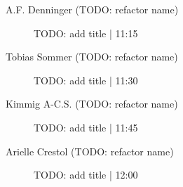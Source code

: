 \begin{symposium}
\begin{description}
                \item [A.F. Denninger (TODO: refactor name)] TODO: add title \textcolor{mygray}{ | 11:15}    
                
                \item [Tobias Sommer (TODO: refactor name)] TODO: add title \textcolor{mygray}{ | 11:30}    
                
                \item [Kimmig A-C.S. (TODO: refactor name)] TODO: add title \textcolor{mygray}{ | 11:45}    
                
                \item [Arielle Crestol (TODO: refactor name)] TODO: add title \textcolor{mygray}{ | 12:00}    
                
            \end{description} 
            \end{symposium}
            